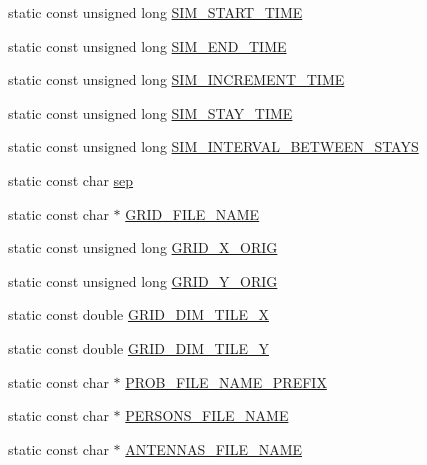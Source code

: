 \begin{DoxyCompactItemize}
\item 
static const unsigned long \mbox{\hyperlink{class_constants_ad8a2d4817d599fd4f608e474bf1052ba}{S\+I\+M\+\_\+\+S\+T\+A\+R\+T\+\_\+\+T\+I\+ME}}
\item 
static const unsigned long \mbox{\hyperlink{class_constants_affb253c69b40f5979cd07383245331b7}{S\+I\+M\+\_\+\+E\+N\+D\+\_\+\+T\+I\+ME}}
\item 
static const unsigned long \mbox{\hyperlink{class_constants_ae689749614ecdd38b50a014400138bc2}{S\+I\+M\+\_\+\+I\+N\+C\+R\+E\+M\+E\+N\+T\+\_\+\+T\+I\+ME}}
\item 
static const unsigned long \mbox{\hyperlink{class_constants_a885a54aa8b2d13632ae3e8ff8e7664fb}{S\+I\+M\+\_\+\+S\+T\+A\+Y\+\_\+\+T\+I\+ME}}
\item 
static const unsigned long \mbox{\hyperlink{class_constants_a396cc1e9abbdf0a536886ebfd6b28045}{S\+I\+M\+\_\+\+I\+N\+T\+E\+R\+V\+A\+L\+\_\+\+B\+E\+T\+W\+E\+E\+N\+\_\+\+S\+T\+A\+YS}}
\item 
static const char \mbox{\hyperlink{class_constants_afc927f63cc5fbb912114d6b0f28b8b4f}{sep}}
\item 
static const char $\ast$ \mbox{\hyperlink{class_constants_aa2fd1c5551c8dab10dc1bd4c0cd0db8f}{G\+R\+I\+D\+\_\+\+F\+I\+L\+E\+\_\+\+N\+A\+ME}}
\item 
static const unsigned long \mbox{\hyperlink{class_constants_ac09062322e1ab9b6e1ca3a568b11c376}{G\+R\+I\+D\+\_\+\+X\+\_\+\+O\+R\+IG}}
\item 
static const unsigned long \mbox{\hyperlink{class_constants_ace48b30468931aaf452ab7a6daf573e0}{G\+R\+I\+D\+\_\+\+Y\+\_\+\+O\+R\+IG}}
\item 
static const double \mbox{\hyperlink{class_constants_a4400d3f97fa2e2be6091a8005efedd7f}{G\+R\+I\+D\+\_\+\+D\+I\+M\+\_\+\+T\+I\+L\+E\+\_\+X}}
\item 
static const double \mbox{\hyperlink{class_constants_a08f9273d844b68a74fd979d5a46d4918}{G\+R\+I\+D\+\_\+\+D\+I\+M\+\_\+\+T\+I\+L\+E\+\_\+Y}}
\item 
static const char $\ast$ \mbox{\hyperlink{class_constants_a3b2d3fc0ccc4636a51190bf5b297d72d}{P\+R\+O\+B\+\_\+\+F\+I\+L\+E\+\_\+\+N\+A\+M\+E\+\_\+\+P\+R\+E\+F\+IX}}
\item 
static const char $\ast$ \mbox{\hyperlink{class_constants_a2388516c40960223c0aef1610fd72312}{P\+E\+R\+S\+O\+N\+S\+\_\+\+F\+I\+L\+E\+\_\+\+N\+A\+ME}}
\item 
static const char $\ast$ \mbox{\hyperlink{class_constants_a23f758b23b88c7cfe23b278647671acb}{A\+N\+T\+E\+N\+N\+A\+S\+\_\+\+F\+I\+L\+E\+\_\+\+N\+A\+ME}}

\end{DoxyCompactItemize}
